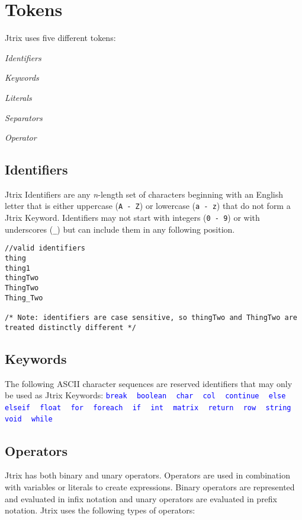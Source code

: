 \documentclass[titlepage, 12pt]{report}
\begin{document}
\section{Tokens}
Jtrix uses five different tokens:

 \textit{Identifiers}

 \textit{Keywords}

 \textit{Literals}

 \textit{Separators}

 \textit{Operator}
\subsection{Identifiers}
Jtrix Identifiers are any \textit{n}-length set of characters beginning with an English letter that is either uppercase (\texttt{A - Z}) or lowercase (\texttt{a - z}) that do not form a Jtrix Keyword. Identifiers may not start with integers (\texttt{0 - 9}) or with underscores (\texttt{\_}) but can include them in any following position.
\begin{lstlisting}
//valid identifiers
thing
thing1
thingTwo
ThingTwo
Thing_Two

/* Note: identifiers are case sensitive, so thingTwo and ThingTwo are treated distinctly different */
\end{lstlisting}

\subsection{Keywords}
The following ASCII character sequences are reserved identifiers that may only be used as Jtrix Keywords:
 \textcolor{blue}{\texttt{break}}		
~	  \textcolor{blue}{\texttt{boolean}}		
~	  \textcolor{blue}{\texttt{char}}	
~	  \textcolor{blue}{\texttt{col}}	
~	  \textcolor{blue}{\texttt{continue}}	
~	  \textcolor{blue}{\texttt{else}}	 
~	 \textcolor{blue}{\texttt{elseif}}	
~	  \textcolor{blue}{\texttt{float}}	
~	 \textcolor{blue}{\texttt{for}}	
~	 \textcolor{blue}{\texttt{foreach}}	
~	  \textcolor{blue}{\texttt{if}}	
~	  \textcolor{blue}{\texttt{int}}	
~	  \textcolor{blue}{\texttt{matrix}}	
~	  \textcolor{blue}{\texttt{return}}	
~	 \textcolor{blue}{\texttt{row}}	
~	  \textcolor{blue}{\texttt{string}}	
~	 \textcolor{blue}{\texttt{void}}	
~	  \textcolor{blue}{\texttt{while}}	

\subsection{Operators}
Jtrix has both binary and unary operators. Operators are used in combination with variables or literals to create expressions. Binary operators are represented and evaluated in infix notation and unary operators are evaluated in prefix notation. Jtrix uses the following types of operators:
\end{document}
